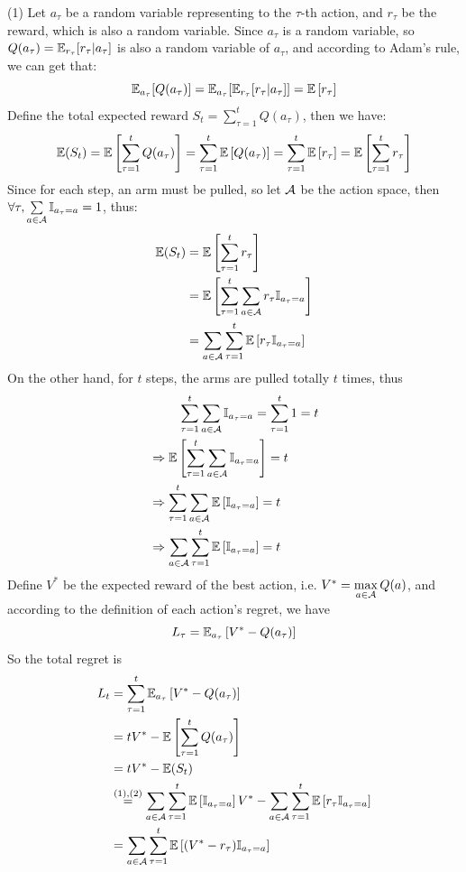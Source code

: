 (1) Let $a_{\tau}$ be a random variable representing to the $\tau$-th action, and $r_{\tau}$ be the reward, which is also a random variable. Since $a_{\tau}$ is a random variable, so $Q(a_\tau) = \mathbb{E}_{r_{\tau}}[r_\tau | a_\tau]$ is also a random variable of $a_{\tau}$, and according to Adam's rule, we can get that:
$$\mathbb{E}_{a_{\tau}}[Q(a_\tau)] = \mathbb{E}_{a_{\tau}}[\mathbb{E}_{r_{\tau}}[r_\tau | a_\tau]] = \mathbb{E}\left[r_\tau\right]$$
Define the total expected reward $S_t = \sum\limits_{\tau=1}^{t}Q(a_\tau)$, then we have:
$$\mathbb{E}(S_t) = \mathbb{E}\left[\sum_{\tau=1}^{t} Q(a_\tau)\right] = \sum_{\tau=1}^{t}\mathbb{E}\left[ Q(a_\tau)\right] = \sum_{\tau=1}^{t}\mathbb{E}\left[r_\tau\right] = \mathbb{E}\left[\sum_{\tau=1}^{t}r_\tau\right] $$
Since for each step, an arm must be pulled, so let $\mathcal{A}$ be the action space, then $\forall \tau, \sum\limits_{a\in\mathcal{A}}\mathbb{I}_{a_\tau = a} = 1$, thus:
\begin{equation}
\begin{aligned}
\mathbb{E}(S_t) & = \mathbb{E}\left[\sum_{\tau=1}^{t}r_\tau\right] \\
&=  \mathbb{E}\left[\sum_{\tau=1}^{t}\sum_{a\in\mathcal{A}}r_\tau \mathbb{I}_{a_\tau = a}\right] \\
&=  \sum_{a\in\mathcal{A}}\sum_{\tau=1}^{t}\mathbb{E}\left[r_\tau \mathbb{I}_{a_\tau = a}\right]
\end{aligned}
\end{equation}
On the other hand, for $t$ steps, the arms are pulled totally $t$ times, thus
\begin{equation}
\begin{aligned}
&\qquad\ \sum_{\tau=1}^{t}\sum_{a\in\mathcal{A}}\mathbb{I}_{a_\tau = a} = \sum_{\tau=1}^{t} 1 = t \\
&\Rightarrow \mathbb{E}\left[\sum_{\tau=1}^{t}\sum_{a\in\mathcal{A}}\mathbb{I}_{a_\tau = a}\right] = t \\
&\Rightarrow \sum_{\tau=1}^{t}\sum_{a\in\mathcal{A}}\mathbb{E}\left[\mathbb{I}_{a_\tau = a}\right] = t \\
&\Rightarrow \sum_{a\in\mathcal{A}}\sum_{\tau=1}^{t}\mathbb{E}\left[\mathbb{I}_{a_\tau = a}\right] = t
\end{aligned}
\end{equation}
Define $V^*$ be the expected reward of the best action, i.e. $V^*=\max\limits_{a\in\mathcal{A}}Q(a)$, and according to the definition of each action's regret, we have
$$L_{\tau}=\mathbb{E}_{a_{\tau}}\left[V^*-Q(a_{\tau})\right]$$
So the total regret is
\begin{equation}
\begin{aligned}
L_t &= \sum_{\tau=1}^{t}\mathbb{E}_{a_{\tau}}\left[{V^{*} - Q(a_\tau)}\right] \\
&= tV^* - \mathbb{E}\left[\sum_{\tau=1}^{t}Q(a_\tau)\right] \\
&= tV^* - \mathbb{E}(S_t)\\
&\stackrel{(1),(2)}{=} \sum_{a\in\mathcal{A}}\sum_{\tau=1}^{t}\mathbb{E}\left[\mathbb{I}_{a_\tau = a}\right]V^* - \sum_{a\in\mathcal{A}}\sum_{\tau=1}^{t}\mathbb{E}\left[r_\tau \mathbb{I}_{a_\tau = a}\right] \\
&= \sum_{a\in\mathcal{A}}\sum_{\tau=1}^{t}\mathbb{E}\left[(V^* - r_\tau)\mathbb{I}_{a_\tau = a}\right]
\end{aligned}
\end{equation}

